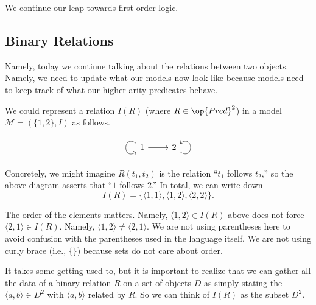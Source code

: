 \documentclass[../notes.tex]{subfiles}
\begin{document}

We continue our leap towards first-order logic.

\subsection{Binary Relations}
Namely, today we continue talking about the relations between two objects. Namely, we need to update what our models now look like because models need to keep track of what our higher-arity predicates behave.
\begin{example} \label{ex:binrelation}
	We could represent a relation $I(R)$ (where $R\in\op{Pred}^2$) in a model $\mathcal M=(\{1,2\},I)$ as follows.
	\[\begin{tikzcd}
		1 \arrow[r] \arrow[loop, distance=2em, in=215, out=145] & 2 \arrow[loop, distance=2em, in=35, out=325]
	\end{tikzcd}\]
	Concretely, we might imagine $R(t_1,t_2)$ is the relation ``$t_1$ follows $t_2$,'' so the above diagram asserts that ``$1$ follows $2$.'' In total, we can write down
	\[I(R)=\{\langle1,1\rangle,\langle1,2\rangle,\langle2,2\rangle\}.\]
\end{example}
\begin{remark}
	The order of the elements matters. Namely, $\langle1,2\rangle\in I(R)$ above does not force $\langle2,1\rangle\in I(R)$. Namely, $\langle1,2\rangle\ne\langle2,1\rangle$. We are not using parentheses here to avoid confusion with the parentheses used in the language itself. We are not using curly brace (i.e., $\{\}$) because sets do not care about order.
\end{remark}
It takes some getting used to, but it is important to realize that we can gather all the data of a binary relation $R$ on a set of objects $D$ as simply stating the $\langle a,b\rangle\in D^2$ with $\langle a,b\rangle$ related by $R$. So we can think of $I(R)$ as the subset $D^2$.
\end{document}
